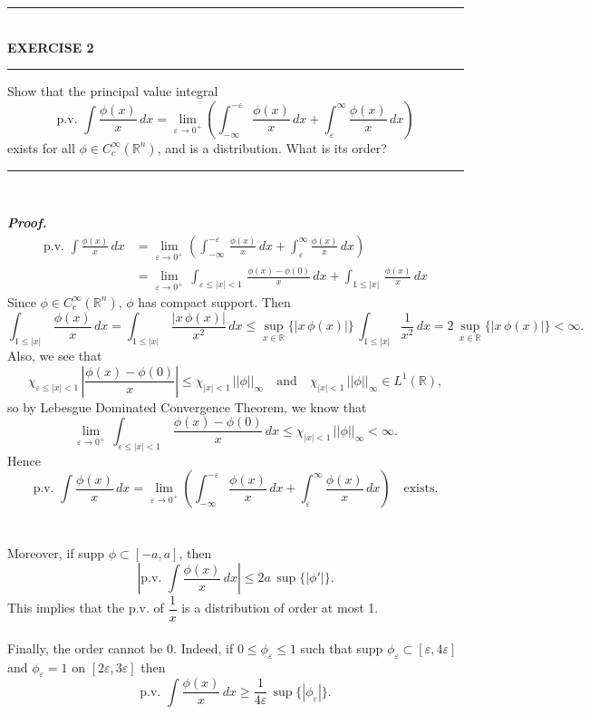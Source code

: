 \documentclass[a4paper,11pt]{article}
\begin{document}
	\begin{flushleft}
		\rule[-0.5ex]{17cm}{2pt}\\
			\textbf{EXERCISE 2}\\
		\rule[1.5ex]{17cm}{0.5pt}
			Show that the principal value integral
				$$\text{p.v. }
				\int \frac{\phi(x)}{x}\,dx
				= \underset{\varepsilon \to 0^+}{\lim}
				\left( \int_{-\infty}^{-\varepsilon}\,\frac{\phi(x)}{x}\,dx
				+ \int_\varepsilon^\infty \frac{\phi(x)}{x}\,dx \right)$$
			exists for all $\phi \in C_c^\infty(\mathbb{R}^n)$, and is a distribution. What is its order?
		\rule[1.0ex]{17cm}{0.5pt}\
	\end{flushleft}
	\textbf{\textit{Proof.}}
		$$\begin{aligned}
		\text{p.v. }
		\int \frac{\phi(x)}{x}\,dx
		&= \underset{\varepsilon \to 0^+}{\lim}
		\left( \int_{-\infty}^{-\varepsilon}\,\frac{\phi(x)}{x}\,dx
		+ \int_\varepsilon^\infty \frac{\phi(x)}{x}\,dx \right)\\
		&= \underset{\varepsilon \to 0^+}{\lim}\,\int_{\varepsilon \leq |x| < 1}\,\frac{\phi(x) - \phi(0)}{x}\,dx
		+ \int_{1 \leq |x|}\,\frac{\phi(x)}{x}\,dx
		\end{aligned}$$
	Since $\phi \in C_c^\infty(\mathbb{R}^n)$, $\phi$ has compact support. Then
		$$\int_{1 \leq |x|}\,\frac{\phi(x)}{x}\,dx
		= \int_{1 \leq |x|}\,\frac{|x\,\phi(x)|}{x^2}\,dx
		\leq \underset{x \in \mathbb{R}}{\sup}\{|x\,\phi(x)|\}\,\int_{1 \leq |x|} \frac{1}{x^2}\,dx
		= 2\,\underset{x \in \mathbb{R}}{\sup}\{|x\,\phi(x)|\}
		< \infty.$$
	Also, we see that
		$$\chi_{\varepsilon \leq |x| < 1}\,\left|\frac{\phi(x) - \phi(0)}{x}\right|
		\leq \chi_{|x| < 1}\,||\phi||_{\infty}
		\quad \text{and} \quad
		\chi_{|x| < 1}\,||\phi||_{\infty} \in L^1(\mathbb{R}),$$
	so by Lebesgue Dominated Convergence Theorem, we know that
		$$\underset{\varepsilon \to 0^+}{\lim}\,\int_{\varepsilon \leq |x| < 1}\,\frac{\phi(x) - \phi(0)}{x}\,dx
		\leq \chi_{|x| < 1}\,||\phi||_{\infty}
		< \infty.$$
	Hence
		$$\text{p.v. }
		\int \frac{\phi(x)}{x}\,dx
		= \underset{\varepsilon \to 0^+}{\lim}
		\left( \int_{-\infty}^{-\varepsilon}\,\frac{\phi(x)}{x}\,dx
		+ \int_\varepsilon^\infty \frac{\phi(x)}{x}\,dx \right)
		\quad \text{exists.}$$\\\\
	Moreover, if supp $\phi \subset [-a,a]$, then
		$$\left|\text{p.v. }\int \frac{\phi(x)}{x}\,dx\right|
		\leq 2a\,\sup\{|\phi'|\}.$$
	This implies that the p.v. of $\dfrac{1}{x}$ is a distribution of order at most 1.\\\\
	Finally, the order cannot be 0. Indeed, if $0 \leq \phi_\varepsilon \leq 1$ such that supp $\phi_\varepsilon \subset [\varepsilon,4\varepsilon]$ and $\phi_{\varepsilon} = 1$ on $[2\varepsilon, 3\varepsilon]$ then
		$$\text{p.v. } \int \frac{\phi(x)}{x}\,dx \geq \frac{1}{4\varepsilon}\,\sup\{|\phi_{\varepsilon}|\}.$$\\
\end{document}
